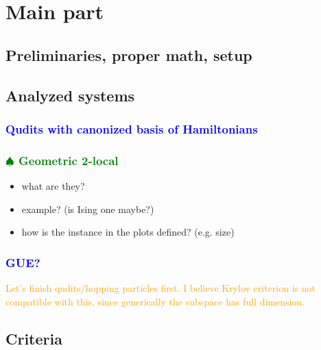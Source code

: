 \documentclass[aps,prx,reprint,superscriptaddress,footnote, twocolumn,notitlepage]{revtex4-2}
\newcommand{\yu}[1]{\textcolor{blue}{#1}}
\newcommand{\tom}[1]{\textcolor{green}{#1}}
\newcommand{\ko}[1]{\textcolor{orange}{#1}}
\newcommand{\todotom}[1]{\tom{$\spadesuit$ #1}}
\begin{document}
\section{Main part }
\subsection{Preliminaries, proper math, setup}
\subsection{Analyzed systems}\label{sec:systems}
\subsubsection{\yu{Qudits with canonized basis of Hamiltonians}}

 \subsubsection{\todotom{Geometric 2-local}} \label{sec:geo2}
 \begin{itemize}
     \item what are they?
     \item example? (is Ising one maybe?)
     \item how is the instance in the plots defined? (e.g. size)
 \end{itemize}
\subsubsection{\yu{GUE?}}
\ko{Let's finish qudits/hopping particles first. I believe Krylov criterion is not compatible with this, since generically the subspace has full dimension.}
\subsection{Criteria}

\end{document}
